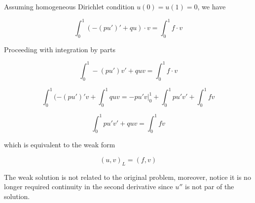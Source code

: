 Assuming homogeneous Dirichlet condition $u(0)=u(1)=0$, we have

\begin{equation}
\int_{0}^{1} (-(pu')' + qu)\cdot v = \int_{0}^{1} f\cdot v
\end{equation}

Proceeding with  integration by parts

\begin{equation}
\int_{0}^{1} -(pu')v' + quv  = \int_{0}^{1} f\cdot v
\end{equation}

\begin{equation}
\int_{0}^{1} (-(pu')' v +\int_{0}^{1} qu v =   - pu'v \Big|_0^1  +   \int_{0}^{1} pu'v' + \int_{0}^{1} fv
\end{equation}
	
\begin{equation}
  \int_{0}^{1} pu'v' + qu v  =  \int_{0}^{1} fv
\end{equation}

which is equivalent to the weak form 

\begin{equation}
(u,v)_L = (f,v)
\end{equation}

The weak solution is not related to the original problem, moreover, notice it is no longer required continuity in the second derivative since $u''$  is not par of the solution. 